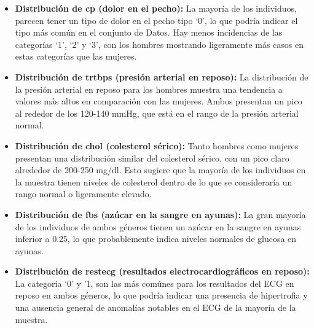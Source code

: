 \documentclass[
]{article}
\begin{document}
\begin{itemize}
\item
  \textbf{Distribución de cp (dolor en el pecho):} La mayoría de los
  individuos, parecen tener un tipo de dolor en el pecho tipo `0', lo
  que podría indicar el tipo más común en el conjunto de Datos. Hay
  menos incidencias de las categorías `1', `2' y `3', con los hombres
  mostrando ligeramente más casos en estas categorías que las mujeres.
\item
  \textbf{Distribución de trtbps (presión arterial en reposo):} La
  distribución de la presión arterial en reposo para los hombres muestra
  una tendencia a valores más altos en comparación con las mujeres.
  Ambos presentan un pico al rededor de los 120-140 mmHg, que está en el
  rango de la presión arterial normal.
\item
  \textbf{Distribución de chol (colesterol sérico):} Tanto hombres como
  mujeres presentan una distribución similar del colesterol sérico, con
  un pico claro alrededor de 200-250 mg/dl. Esto sugiere que la mayoría
  de los individuos en la muestra tienen niveles de colesterol dentro de
  lo que se consideraría un rango normal o ligeramente elevado.
\item
  \textbf{Distribución de fbs (azúcar en la sangre en ayunas):} La gran
  mayoría de los individuos de ambos géneros tienen un azúcar en la
  sangre en ayunas inferior a 0.25, lo que probablemente indica niveles
  normales de glucosa en ayunas.
\item
  \textbf{Distribución de restecg (resultados electrocardiográficos en
  reposo):} La categoría `0' y '1, son las más comúnes para los
  resultados del ECG en reposo en ambos géneros, lo que podría indicar
  una presencia de hipertrofia y una ausencia general de anomalías
  notables en el ECG de la mayoría de la muestra.
\end{itemize}
\end{document}
